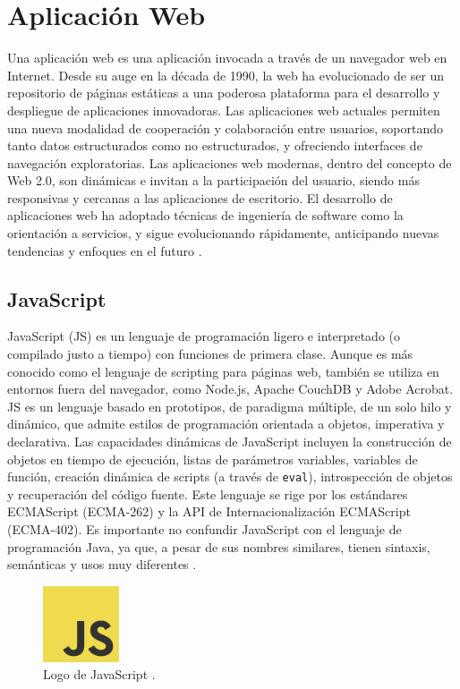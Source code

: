 \section{Aplicación Web}
Una aplicación web es una aplicación invocada a través de un navegador web en
Internet. Desde su auge en la década de 1990, la web ha evolucionado de ser un
repositorio de páginas estáticas a una poderosa plataforma para el desarrollo y
despliegue de aplicaciones innovadoras. Las aplicaciones web actuales permiten
una nueva modalidad de cooperación y colaboración entre usuarios, soportando
tanto datos estructurados como no estructurados, y ofreciendo interfaces de
navegación exploratorias. Las aplicaciones web modernas, dentro del concepto de
Web 2.0, son dinámicas e invitan a la participación del usuario, siendo más
responsivas y cercanas a las aplicaciones de escritorio. El desarrollo de
aplicaciones web ha adoptado técnicas de ingeniería de software como la
orientación a servicios, y sigue evolucionando rápidamente, anticipando nuevas
tendencias y enfoques en el futuro \cite{4221621}.

\subsection{JavaScript}
JavaScript (JS) es un lenguaje de programación ligero e interpretado (o compilado
justo a tiempo) con funciones de primera clase. Aunque es más conocido como el
lenguaje de scripting para páginas web, también se utiliza en entornos fuera del
navegador, como Node.js, Apache CouchDB y Adobe Acrobat. JS es un lenguaje
basado en prototipos, de paradigma múltiple, de un solo hilo y dinámico, que
admite estilos de programación orientada a objetos, imperativa y declarativa.
Las capacidades dinámicas de JavaScript incluyen la construcción de objetos en
tiempo de ejecución, listas de parámetros variables, variables de función,
creación dinámica de scripts (a través de \texttt{eval}), introspección de objetos
y recuperación del código fuente. Este lenguaje se rige por los estándares
ECMAScript (ECMA-262) y la API de Internacionalización ECMAScript (ECMA-402).
Es importante no confundir JavaScript con el lenguaje de programación Java, ya
que, a pesar de sus nombres similares, tienen sintaxis, semánticas y usos muy
diferentes \cite{mdn_javascript}.

\begin{figure}[!htbp]
  \centering
  \includegraphics[width=0.2\textwidth]{imagenes/02-marco-teorico/javascript-logo.png}
  \caption[Logo de JavaScript]{Logo de JavaScript \cite{mdn_javascript}.}
  \label{fig:javascript-logo}
\end{figure}

